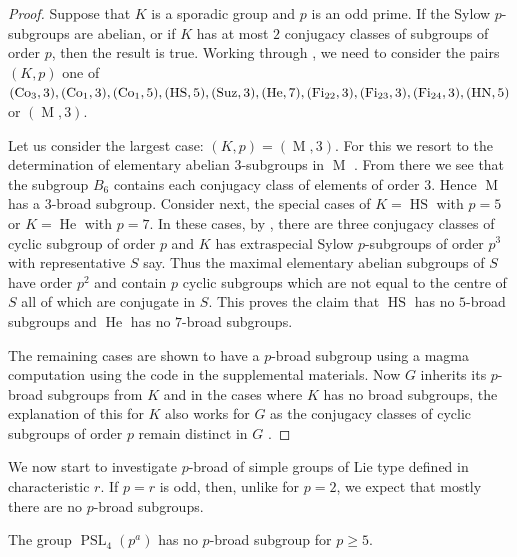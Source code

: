 \documentclass[12pt,a4paper]{amsart}
\DeclareMathOperator{\M}{M}
\DeclareMathOperator{\HN}{HN}
\DeclareMathOperator{\HS}{HS}
\DeclareMathOperator{\Fi}{Fi}
\DeclareMathOperator{\He}{He}
\DeclareMathOperator{\Suz}{Suz}
\DeclareMathOperator{\Co}{Co}
\DeclareMathOperator{\PSL}{PSL}
\begin{document}
\begin{proof} Suppose that $K$ is a sporadic group and $p$ is an odd prime. If the Sylow $p$-subgroups are abelian, or if $K$ has at most $2$ conjugacy classes of subgroups of order $p$, then the result is true. Working through \cite[Table 5.3]{GLS3}, we need to consider the pairs $(K,p)$ one of
$ (\Co_3,3),(\Co_1,3),(\Co_1,5),(\HS,5),(\Suz,3),(\He,7),
(\Fi_{22},3),(\Fi_{23},3),\\(\Fi_{24},3),(\HN,5)$ or $(\M,3)$.

Let us consider  the largest case: $(K,p)=(\M,3)$. For this we resort to the determination of elementary abelian $3$-subgroups in $\M$ \cite[Table VI]{Richardson}. From there we see that the subgroup $B_6$ contains each conjugacy class of elements of order $3$. Hence $\M$ has a $3$-broad subgroup.
Consider next, the special cases of $K=\HS$ with $p=5$ or $K=\He$ with $p=7$. In these cases, by \cite[Tables 5.3m and 5.3p]{GLS3},  there are three conjugacy classes of cyclic subgroup of order $p$ and $K$ has extraspecial Sylow $p$-subgroups of order $p^3$ with representative $S$ say. Thus the maximal elementary abelian subgroups of $S$ have order $p^2$ and contain $p$ cyclic   subgroups which are not equal to the centre of $S$ all of which are conjugate in $S$. This proves the claim that $\HS$ has no $5$-broad subgroups and  $\He$ has no $7$-broad subgroups.

The remaining cases are shown to have a $p$-broad subgroup using a {\sc magma} computation using the code in the supplemental materials. Now $G$ inherits its $p$-broad subgroups from $K$ and in the cases where $K$ has no broad subgroups, the explanation of this for $K$ also works for $G$ as the conjugacy classes of cyclic subgroups of order $p$ remain distinct in $G$ \cite[Tables 5.3m and 5.3p]{GLS3}.
\end{proof}


We now start to investigate $p$-broad of simple groups of Lie type defined in characteristic $r$. If $p=r$ is odd, then, unlike for $p=2$, we expect that mostly there are no $p$-broad subgroups.


\begin{example}
The group $\PSL_4(p^a)$ has no $p$-broad subgroup for $p \ge 5$.
\end{example}
\end{document}
